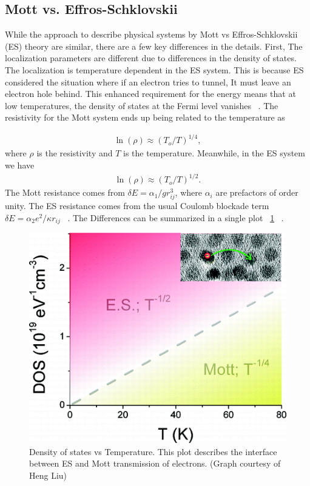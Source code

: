 \subsection{Mott vs. Effros-Schklovskii}
While the approach to describe physical systems by Mott vs Effros-Schklovskii (ES) theory are similar, there are a few key differences in the details. First, The localization parameters are different due to differences in the density of states. The localization is temperature dependent in the ES system. This is because ES considered the situation where if an electron tries to tunnel, It must leave an electron hole behind. This enhanced requirement for the energy means that at low temperatures, the density of states at the Fermi level vanishes ~\cite{joung}. The resistivity for the Mott system ends up being related to the temperature as

\begin{eqnarray}
\ln(\rho) \approx (T_o / T)^{1/4} ,
\label{fourth}
\end{eqnarray}
where $\rho$ is the resistivity and $T$ is the temperature. Meanwhile, in the ES system we have
\begin{eqnarray}
\ln(\rho) \approx (T_o / T)^{1/2}.
\label{half}
\end{eqnarray}
The Mott resistance comes from $\delta E = \alpha_1 / g r_{ij}^3 $, where $\alpha_i$ are prefactors of order unity. The ES resistance comes from the usual Coulomb blockade term $\delta E = \alpha_2 e^2 / \kappa r_{ij}$ ~\cite{aharony92}. The Differences can be summarized in a single plot ~\ref{MvsES} ~\cite{Liu10}.

\begin{figure}[htbp]
\begin{center}
\includegraphics[scale=.50]{MottvsES.png}
\caption{Density of states vs Temperature. This plot describes the interface between ES and Mott transmission of electrons. (Graph courtesy of Heng Liu)}
\label{MvsES}
\end{center}
\end{figure}


